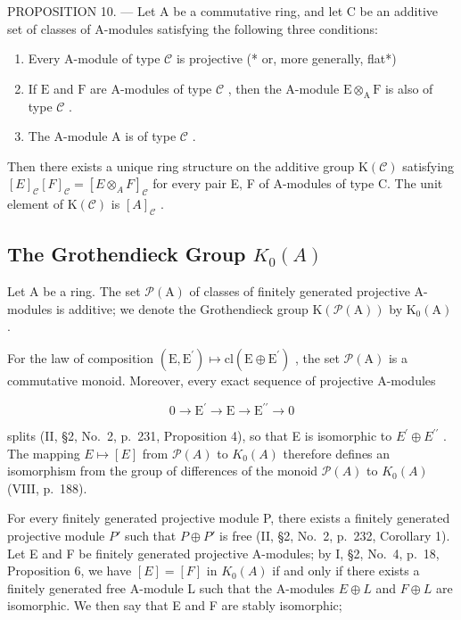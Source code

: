 PROPOSITION 10. --- Let A be a commutative ring, and let C be an additive set of classes of A-modules satisfying the following three conditions:

\begin{enumerate}
\def\labelenumi{(\roman{enumi})}
\item
  Every A-module of type \(\mathcal{C}\) is projective (* or, more generally, flat*)
\item
  If \(\mathrm{E}\) and \(\mathrm{F}\) are A-modules of type \(\mathcal{C}\) , then the A-module \(\mathrm{E} \otimes_{\mathrm{A}} \mathrm{F}\) is also of type \(\mathcal{C}\) .
\item
  The A-module A is of type \(\mathcal{C}\) .
\end{enumerate}

Then there exists a unique ring structure on the additive group \(\mathrm{K}(\mathcal{C})\) satisfying \([E]_{\mathcal{C}}[F]_{\mathcal{C}} = [E \otimes_{A} F]_{\mathcal{C}}\) for every pair E, F of A-modules of type C. The unit element of \(\mathrm{K}(\mathcal{C})\) is \([A]_{\mathcal{C}}\) .

\subsection{\texorpdfstring{The Grothendieck Group \(K_{0}(A)\)}{The Grothendieck Group K\_\{0\}(A)}}

Let \(\mathrm{A}\) be a ring. The set \(\mathcal{P}(\mathrm{A})\) of classes of finitely generated projective A-modules is additive; we denote the Grothendieck group \(\mathrm{K}(\mathcal{P}(\mathrm{A}))\) by \(\mathrm{K}_0(\mathrm{A})\) .

For the law of composition \((\mathrm{E},\mathrm{E}^{\prime})\mapsto\mathrm{cl}(\mathrm{E}\oplus\mathrm{E}^{\prime})\) , the set \(\mathcal{P}(\mathrm{A})\) is a commutative monoid. Moreover, every exact sequence of projective A-modules

\[
0 \longrightarrow \mathrm{E} ^ {\prime} \longrightarrow \mathrm{E} \longrightarrow \mathrm{E} ^ {\prime \prime} \longrightarrow 0
\]

splits (II, §2, No.~2, p.~231, Proposition 4), so that E is isomorphic to \(E^{\prime} \oplus E^{\prime\prime}\) . The mapping \(E \mapsto [E]\) from \(\mathcal{P}(A)\) to \(K_{0}(A)\) therefore defines an isomorphism from the group of differences of the monoid \(\mathcal{P}(A)\) to \(K_{0}(A)\) (VIII, p.~188).

For every finitely generated projective module P, there exists a finitely generated projective module \(P'\) such that \(P \oplus P'\) is free (II, §2, No.~2, p.~232, Corollary 1). Let E and F be finitely generated projective A-modules; by I, §2, No.~4, p.~18, Proposition 6, we have \([E] = [F]\) in \(K_{0}(A)\) if and only if there exists a finitely generated free A-module L such that the A-modules \(E \oplus L\) and \(F \oplus L\) are isomorphic. We then say that E and F are stably isomorphic;

